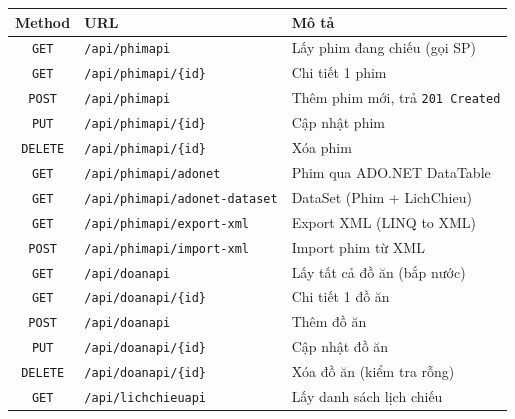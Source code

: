 \documentclass[12pt,a4paper,oneside]{book}
\theoremstyle{plain}
\numberwithin{equation}{chapter}
\begin{document}
\begin{table}[H]
    \begin{center}
        \begin{tabular}{|c|l|l|}
            \hline
            \textbf{Method} & \textbf{URL} & \textbf{Mô tả} \\
            \hline
            \texttt{GET}    & \texttt{/api/phimapi}              & Lấy phim đang chiếu (gọi SP) \\
            \hline
            \texttt{GET}    & \texttt{/api/phimapi/\{id\}}       & Chi tiết 1 phim \\
            \hline
            \texttt{POST}   & \texttt{/api/phimapi}              & Thêm phim mới, trả \texttt{201 Created} \\
            \hline
            \texttt{PUT}    & \texttt{/api/phimapi/\{id\}}       & Cập nhật phim \\
            \hline
            \texttt{DELETE} & \texttt{/api/phimapi/\{id\}}       & Xóa phim \\
            \hline
            \texttt{GET}    & \texttt{/api/phimapi/adonet}       & Phim qua ADO.NET DataTable \\
            \hline
            \texttt{GET}    & \texttt{/api/phimapi/adonet-dataset} & DataSet (Phim + LichChieu) \\
            \hline
            \texttt{GET}    & \texttt{/api/phimapi/export-xml}   & Export XML (LINQ to XML) \\
            \hline
            \texttt{POST}   & \texttt{/api/phimapi/import-xml}   & Import phim từ XML \\
            \hline
            \hline
            \texttt{GET}    & \texttt{/api/doanapi}              & Lấy tất cả đồ ăn (bắp nước) \\
            \hline
            \texttt{GET}    & \texttt{/api/doanapi/\{id\}}       & Chi tiết 1 đồ ăn \\
            \hline
            \texttt{POST}   & \texttt{/api/doanapi}              & Thêm đồ ăn \\
            \hline
            \texttt{PUT}    & \texttt{/api/doanapi/\{id\}}       & Cập nhật đồ ăn \\
            \hline
            \texttt{DELETE} & \texttt{/api/doanapi/\{id\}}       & Xóa đồ ăn (kiểm tra rỗng) \\
            \hline
            \hline
            \texttt{GET}    & \texttt{/api/lichchieuapi}         & Lấy danh sách lịch chiếu \\

\end{tabular}
\end{center}
\end{table}
\end{document}
